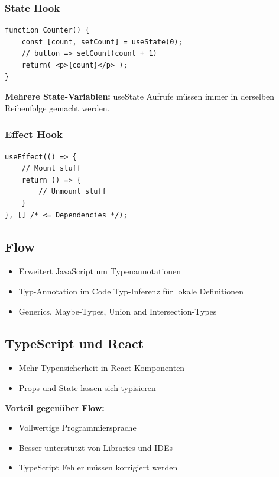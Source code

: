 \subsubsection{State Hook}
\begin{lstlisting}
function Counter() {
    const [count, setCount] = useState(0);
    // button => setCount(count + 1)
    return( <p>{count}</p> );
}
\end{lstlisting}
\textbf{Mehrere State-Variablen:} useState Aufrufe müssen immer in derselben Reihenfolge gemacht werden.

\subsubsection{Effect Hook}
\begin{lstlisting}
useEffect(() => {
    // Mount stuff
    return () => {
        // Unmount stuff
    }
}, [] /* <= Dependencies */);
\end{lstlisting}

\subsection{Flow}
\begin{itemize}
    \item Erweitert JavaScript um Typenannotationen
    \item Typ-Annotation im Code Typ-Inferenz für lokale Definitionen
    \item Generics, Maybe-Types, Union and Intersection-Types
\end{itemize}

\subsection{TypeScript und React}
\begin{itemize}
    \item Mehr Typensicherheit in React-Komponenten
    \item Props und State lassen sich typisieren
\end{itemize}
\textbf{Vorteil gegenüber Flow:}
\begin{itemize}
    \item Vollwertige Programmiersprache
    \item Besser unterstützt von Libraries und IDEs
    \item TypeScript Fehler müssen korrigiert werden
\end{itemize}

